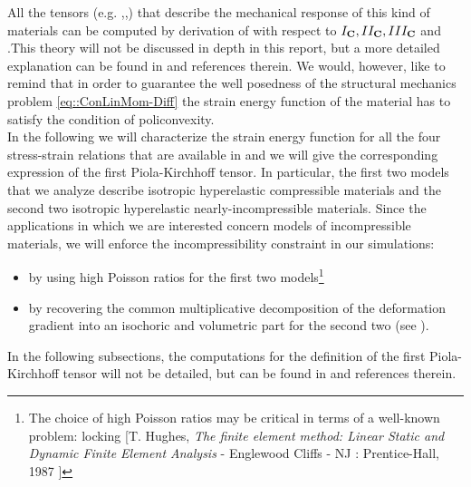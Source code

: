 All the tensors (e.g. \F,\T,\Piola) that describe the
mechanical response of this kind of materials can be computed by
derivation of \W with respect to $I_{\textbf{C}},II_{\textbf{C}},III_{\textbf{C}}$ and \C.This
theory will not be discussed in depth in this report, but a more
detailed explanation can be found in \cite{GM,Deluca} and references
therein. We would, however, like to remind that in order to guarantee
the well posedness of the structural mechanics problem
\eqref{eq::ConLinMom-Diff} the strain energy function \W of the
material has to satisfy the condition of policonvexity.\\ In the
following we will characterize the strain energy function for all the
four stress-strain relations that are available in \LV and we will
give the corresponding expression of the first Piola-Kirchhoff
tensor. In particular, the first two models that we analyze describe
isotropic hyperelastic compressible materials and the second two
isotropic hyperelastic nearly-incompressible materials. Since the
applications in which we are interested concern models of incompressible
materials, we will enforce the incompressibility constraint in our
simulations:
\begin{itemize}
\item by using high Poisson ratios for the first two
  models\footnote{The choice of high Poisson ratios may be critical in
    terms of a well-known problem: locking [T. Hughes, \textit{The finite element method:
        Linear Static and Dynamic Finite Element Analysis} - Englewood Cliffs - NJ : Prentice-Hall, 1987  ]}
\item by recovering the common multiplicative decomposition of the
  deformation gradient \F into an isochoric and volumetric part for the
  second two (see \cite{BonetWood}).
\end{itemize} In the following subsections, the computations for the
definition of the first Piola-Kirchhoff tensor will not be detailed,
but can be found in \cite{Deluca} and references therein.

